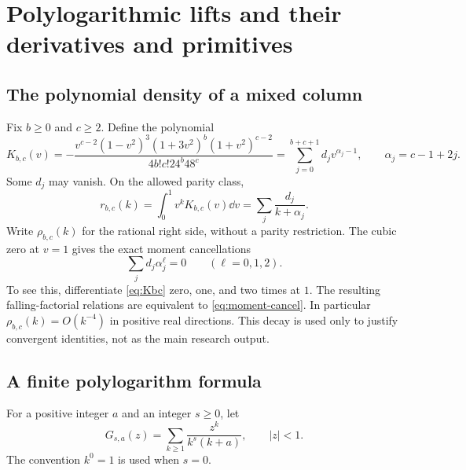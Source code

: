 \section{Polylogarithmic lifts and their derivatives and primitives}
\label{sec:polylogs}

\subsection{The polynomial density of a mixed column}

Fix $b\ge0$ and $c\ge2$. Define the polynomial
\begin{equation}\label{eq:Kbc}
 K_{b,c}(v)=
 -\frac{v^{c-2}(1-v^2)^3(1+3v^2)^b(1+v^2)^{c-2}}
 {4b!c!24^b48^c}
 =\sum_{j=0}^{b+c+1}d_jv^{\alpha_j-1},
 \qquad \alpha_j=c-1+2j.
\end{equation}
Some $d_j$ may vanish. On the allowed parity class,
\begin{equation}\label{eq:rho}
 r_{b,c}(k)=\int_0^1v^kK_{b,c}(v)\dd v
          =\sum_j\frac{d_j}{k+\alpha_j}.
\end{equation}
Write $\rho_{b,c}(k)$ for the rational right side, without a parity restriction. The cubic zero at $v=1$ gives the exact moment cancellations
\begin{equation}\label{eq:moment-cancel}
 \sum_jd_j\alpha_j^\ell=0\qquad(\ell=0,1,2).
\end{equation}
To see this, differentiate \eqref{eq:Kbc} zero, one, and two times at $1$. The resulting falling-factorial relations are equivalent to \eqref{eq:moment-cancel}. In particular $\rho_{b,c}(k)=O(k^{-4})$ in positive real directions. This decay is used only to justify convergent identities, not as the main research output.

\subsection{A finite polylogarithm formula}

For a positive integer $a$ and an integer $s\ge0$, let
\[
 G_{s,a}(z)=\sum_{k\ge1}\frac{z^k}{k^s(k+a)},\qquad |z|<1.
\]
The convention $k^0=1$ is used when $s=0$.

